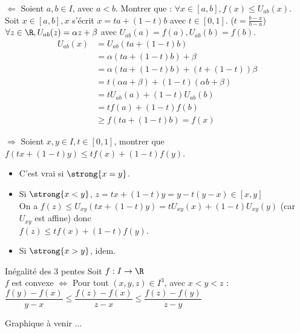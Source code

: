 \documentclass[12pt,a4paper]{report}
\begin{document}
\begin{demo}
$\Longleftarrow$ Soient $a,b \in I$, avec $a<b$. Montrer que : $\forall x \in [a,b], f(x) \le U_{ab}(x)$. \\
Soit $x \in [a,b], x$ s'écrit $x = ta + (1-t)b$ avec $t \in [0,1]$. ($t = \frac{b-x}{b-a}$) \\
$\forall z \in \R, U_{ab}(z) = \alpha z + \beta$ avec $U_{ab}(a) = f(a), U_{ab}(b) = f(b)$. \\
\begin{align*}
U_{ab}(x) &= U_{ab}(ta+(1-t)b) \\
&= \alpha(ta+(1-t)b)+\beta \\
&= \alpha(ta + (1-t)b) + (t+(1-t))\beta \\
&= t(\alpha a + \beta) + (1-t) (\alpha b + \beta) \\
&= tU_{ab}(a) + (1-t)U_{ab}(b) \\
&= tf(a) + (1-t)f(b) \\
&\geq f(ta+(1-t)b) =f(x)
\end{align*}

$\Longrightarrow$ Soient $x,y \in I, t \in [0,1]$, montrer que $f(tx+(1-t)y) \le tf(x) + (1-t)f(y)$. \\
\begin{itemize}
	\item C'est vrai si $\strong{x=y}$.
	\item Si $\strong{x < y}$, $z = tx+(1-t)y = y - t(y-x) \in [x,y]$ \\
		On a $f(z) \le U_{xy}(tx+(1-t)y) = t U_{xy}(x) + (1-t)U_{xy}(y)$ (car $U_{xy}$ est affine) donc \\
		$f(z) \le tf(x) + (1-t)f(y)$.
	\item Si $\strong{x>y}$, idem.
\end{itemize}
\end{demo}

\begin{theoreme}{Inégalité des 3 pentes \footnotemark}{}
Soit $f:I\to \R$\\
$f$ est convexe $\Longleftrightarrow$ Pour tout $(x,y,z)\in I^3$, avec $x<y<z$ : $\dfrac{f(y)-f(x)}{y-x}\leq \dfrac{f(z)-f(x)}{z-x} \leq \dfrac{f(z)-f(y)}{z-y}$
\end{theoreme}


\begin{remarque}[Illustration]
\begin{center}
Graphique à venir ...
\end{center}
\end{remarque}
\end{document}
